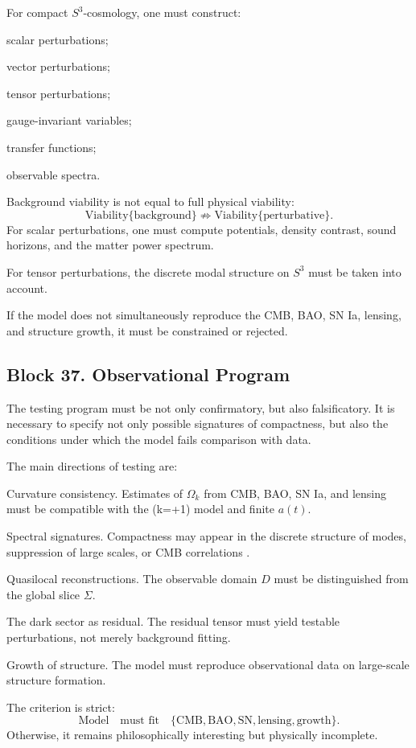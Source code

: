 \documentclass[12pt,a4paper]{article}
\theoremstyle{definition}
\begin{document}
For compact \(S^3\)-cosmology, one must construct:

scalar perturbations;

vector perturbations;

tensor perturbations;

gauge-invariant variables;

transfer functions;

observable spectra.

Background viability is not equal to full physical viability:
\[
\mathrm{Viability}\{\mathrm{background}\}
\not\Rightarrow
\mathrm{Viability}\{\mathrm{perturbative}\}.
\]
For scalar perturbations, one must compute potentials, density contrast, sound horizons, and the matter power spectrum.

For tensor perturbations, the discrete modal structure on \(S^3\) must be taken into account.

If the model does not simultaneously reproduce the CMB, BAO, SN Ia, lensing, and structure growth, it must be constrained or rejected.



\subsection{Block 37. Observational Program}
The testing program must be not only confirmatory, but also falsificatory. It is necessary to specify not only possible signatures of compactness, but also the conditions under which the model fails comparison with data.

The main directions of testing are:

Curvature consistency.
Estimates of \(\Omega_k\) from CMB, BAO, SN Ia, and lensing must be compatible with the (k=+1) model and finite $a(t)$.

Spectral signatures.
Compactness may appear in the discrete structure of modes, suppression of large scales, or CMB correlations \cite{PlanckTopology2016,Cornishetal2004}.

Quasilocal reconstructions.
The observable domain \(D\) must be distinguished from the global slice \(\Sigma\).

The dark sector as residual.
The residual tensor must yield testable perturbations, not merely background fitting.

Growth of structure.
The model must reproduce observational data on large-scale structure formation.

The criterion is strict:
\[
\mathrm{Model}
\quad
\text{must fit}
\quad
\{
\mathrm{CMB},\mathrm{BAO},\mathrm{SN},\mathrm{lensing},\mathrm{growth}
\}.
\]
Otherwise, it remains philosophically interesting but physically incomplete.
\end{document}
